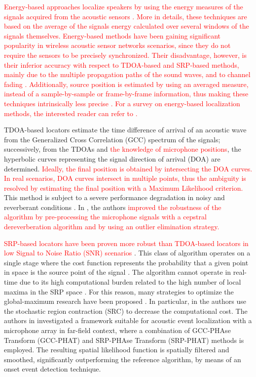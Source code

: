 \documentclass[review]{elsarticle}
\begin{document}
\textcolor{red}{Energy-based approaches localize speakers by using the energy measures of the signals acquired from the acoustic sensors \cite{Cobos2017,Meng2017}. More in details, these techniques are based on the average of the signals energy calculated over several windows of the signals themselves. Energy-based methods have been gaining significant popularity in wireless acoustic sensor networks scenarios, since they do not require the sensors to be precisely synchronized. Their disadvantage, however, is their inferior accuracy with respect to TDOA-based and SRP-based methods, mainly due to the multiple propagation paths of the sound waves, and to channel fading \cite{Cobos2017}. Additionally, source position is estimated by using an averaged measure, instead of a sample-by-sample or frame-by-frame information, thus making these techniques intrinsically less precise \cite{Cobos2017}. For a survey on energy-based localization methods, the interested reader can refer to \cite{Cobos2017,Meng2017}.}

TDOA-based locators estimate the time difference of arrival of an acoustic wave from the Generalized Cross Correlation (GCC) spectrum of the signals; successively, from the TDOAs and \textcolor{red}{the knowledge of microphone positions}, the hyperbolic curves representing the signal direction of arrival (DOA) are determined. \textcolor{red}{Ideally, the final position is obtained by intersecting the DOA curves. In real scenarios, DOA curves intersect in multiple points, thus the ambiguity is resolved by estimating the final position with a Maximum Likelihood criterion.}  This method is subject to a severe performance degradation in noisy and reverberant conditions \cite{champagne1996performance}. In \cite{tsiami2014experiments}, the authors \textcolor{red}{improved the robustness of the algorithm by pre-processing the microphone signals with a cepstral dereverberation algorithm and by using an outlier elimination strategy.}

\textcolor{red}{
SRP-based locators have been proven more robust than TDOA-based locators in low Signal to Noise Ratio (SNR) scenarios \cite{Dibiase2001Robust}}. This class of algorithm operates on a single stage where the cost function represents the probability that a given point in space is the source point of the signal \cite{brutti2007classification}. The algorithm cannot operate in real-time due to its high computational burden related to the high number of local maxima in the SRP space \cite{yook2016fast}. For this reason, many strategies to optimize the global-maximum research have been proposed \cite{DoSY07,Minotto2012,Lee2016}. In particular, in \cite{DoSY07} the authors use the stochastic region contraction (SRC) to decrease the computational cost. The authors in \cite{transfeld2015acoustic} investigated a framework  suitable for acoustic event localization with a microphone array in far-field context, where a combination of GCC-PHAse Transform (GCC-PHAT) and SRP-PHAse Transform (SRP-PHAT) methods is employed. The resulting spatial likelihood function is spatially filtered and smoothed, significantly outperforming the reference algorithm, by means of an onset event detection technique. 
\end{document}

